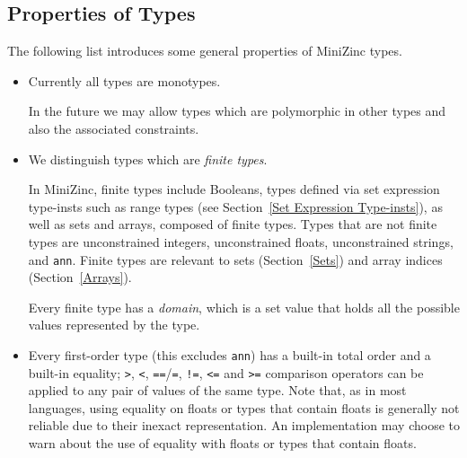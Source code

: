 \documentclass[10pt]{scrartcl}
\begin{document}
\subsection{Properties of Types}
The following list introduces some general properties of MiniZinc types.
\begin{itemize}
\item Currently all types are monotypes.

      In the future we may allow types which are polymorphic
      in other types and also the associated constraints.

\item We distinguish types which are \emph{finite types}.

      In MiniZinc, finite types include Booleans, %
      types defined
      via set expression type-insts such as range types (see
      Section~\ref{Set Expression Type-insts}), as well as sets and arrays,
      composed of finite types.  Types
      that are not finite types are unconstrained integers, unconstrained
      floats, unconstrained strings, and \texttt{ann}.  Finite types are
      relevant to sets (Section~\ref{Sets}) and array indices
      (Section~\ref{Arrays}).

      Every finite type has a \emph{domain}, which is a set value that holds
      all the possible values represented by the type.

\item Every first-order type (this excludes \texttt{ann}) has a built-in
      total order and a built-in equality; \texttt{>}, \texttt{<},
      \texttt{==}/\texttt{=}, \texttt{!=}, \texttt{<=} and \texttt{>=}
      comparison operators can be applied to any
      pair of values of the same type.  
      Note that, as in most languages, using equality on floats or types
      that contain floats is generally not reliable due to their inexact
      representation.  An implementation may choose to warn about the use of
      equality with floats or types that contain floats.

\end{itemize}
\end{document}
